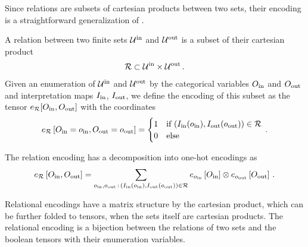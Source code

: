 

Since relations are subsets of cartesian products between two sets, their encoding is a straightforward generalization of .

\begin{definition}
	A relation between two finite sets $\mathcal{U}^{\mathrm{in}}$ and $\mathcal{U}^{\mathrm{out}}$ is a subset of their cartesian product
	\begin{align*}
		 \mathcal{R} \subset \mathcal{U}^{\mathrm{in}} \times \mathcal{U}^{\mathrm{out}} \, .
	\end{align*}
	Given an enumeration of $\mathcal{U}^{\mathrm{in}}$ and $\mathcal{U}^{\mathrm{out}}$ by the categorical variables $O_{\mathrm{in}}$ and $O_{\mathrm{out}}$ and interpretation maps $I_{\mathrm{in}}$, $I_{\mathrm{out}}$, we define the encoding of this subset as the tensor $e_{\mathcal{R}}[O_{\mathrm{in}},O_{\mathrm{out}}]$ with the coordinates
	\begin{align*}
		e_{\mathcal{R}}\left[O_{\mathrm{in}}=o_{\mathrm{in}},O_{\mathrm{out}}=o_{\mathrm{out}}\right]
		= \begin{cases}
		1 & \text{if } (I_{\mathrm{in}}(o_{\mathrm{in}}),I_{\mathrm{out}}(o_{\mathrm{out}})) \in \mathcal{R} \\
		0 & \text{else}
		\end{cases} \, .
	\end{align*}
\end{definition}

The relation encoding has a decomposition into one-hot encodings as
\begin{align*}
	e_{\mathcal{R}}\left[O_{\mathrm{in}},O_{\mathrm{out}}\right]
	= \sum_{o_{\mathrm{in}},o_{\mathrm{out}} \, : \, (I_{\mathrm{in}}(o_{\mathrm{in}}),I_{\mathrm{out}}(o_{\mathrm{out}})) \in \mathcal{R}}
	e_{o_{\mathrm{in}}}\left[O_{\mathrm{in}}\right]  \otimes e_{o_{\mathrm{out}}}\left[O_{\mathrm{out}}\right]  \, .
\end{align*}

Relational encodings have a matrix structure by the cartesian product, which can be further folded to tensors, when the sets itself are cartesian products.
The relational encoding is a bijection between the relations of two sets and the boolean tensors with their enumeration variables.

